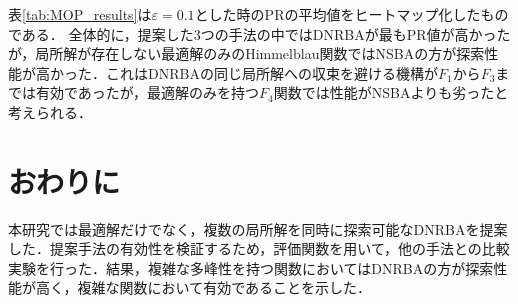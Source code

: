 \documentclass[twocolumn, a4paper]{UECIEresume}
\begin{document}




表\ref{tab:MOP_results}は$\varepsilon=0.1$とした時のPRの平均値をヒートマップ化したものである．
全体的に，提案した3つの手法の中ではDNRBAが最もPR値が高かったが，局所解が存在しない最適解のみのHimmelblau関数ではNSBAの方が探索性能が高かった．これはDNRBAの同じ局所解への収束を避ける機構が$F_1$から$F_3$までは有効であったが，最適解のみを持つ$F_4$関数では性能がNSBAよりも劣ったと考えられる．

\section{おわりに}
本研究では最適解だけでなく，複数の局所解を同時に探索可能なDNRBAを提案した．提案手法の有効性を検証するため，評価関数を用いて，他の手法との比較実験を行った．結果，複雑な多峰性を持つ関数においてはDNRBAの方が探索性能が高く，複雑な関数において有効であることを示した．
\end{document}
